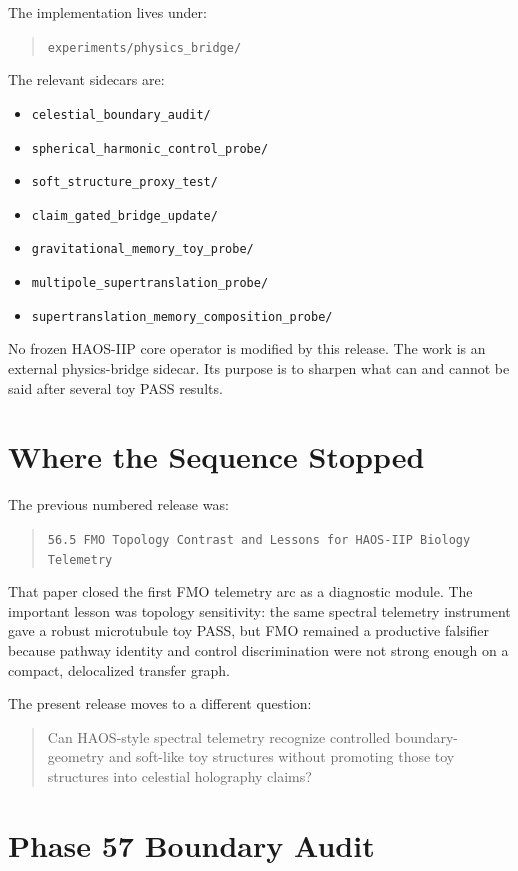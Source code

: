 \documentclass[11pt]{article}
\begin{document}
The implementation lives under:
\begin{quote}
\texttt{experiments/physics\_bridge/}
\end{quote}

The relevant sidecars are:
\begin{itemize}
\item \texttt{celestial\_boundary\_audit/}
\item \texttt{spherical\_harmonic\_control\_probe/}
\item \texttt{soft\_structure\_proxy\_test/}
\item \texttt{claim\_gated\_bridge\_update/}
\item \texttt{gravitational\_memory\_toy\_probe/}
\item \texttt{multipole\_supertranslation\_probe/}
\item \texttt{supertranslation\_memory\_composition\_probe/}
\end{itemize}

No frozen HAOS-IIP core operator is modified by this release. The work is an external physics-bridge sidecar. Its purpose is to sharpen what can and cannot be said after several toy PASS results.

\section{Where the Sequence Stopped}

The previous numbered release was:
\begin{quote}
\texttt{56.5 FMO Topology Contrast and Lessons for HAOS-IIP Biology Telemetry}
\end{quote}

That paper closed the first FMO telemetry arc as a diagnostic module. The important lesson was topology sensitivity: the same spectral telemetry instrument gave a robust microtubule toy PASS, but FMO remained a productive falsifier because pathway identity and control discrimination were not strong enough on a compact, delocalized transfer graph.

The present release moves to a different question:
\begin{quote}
Can HAOS-style spectral telemetry recognize controlled boundary-geometry and soft-like toy structures without promoting those toy structures into celestial holography claims?
\end{quote}

\section{Phase 57 Boundary Audit}
\end{document}
